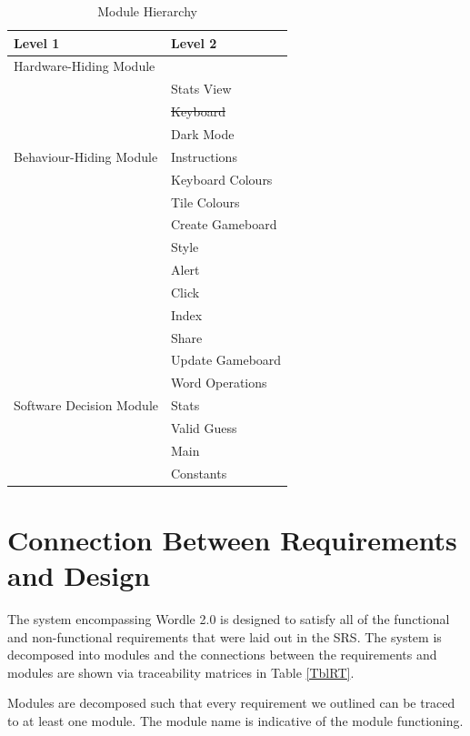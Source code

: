 \documentclass[12pt, titlepage]{article}
\begin{document}
	
	\begin{table}[h!]
		\centering
		\begin{tabular}{p{} p{}}
			\toprule
			\textbf{Level 1} & \textbf{Level 2}\\
			\midrule
			
			{Hardware-Hiding Module} & ~ \\
			\midrule
			
			\multirow{7}{0.3\textwidth}{Behaviour-Hiding Module} & Stats View \\
			& \st{Keyboard}\\
			& Dark Mode\\
			& Instructions\\
			& Keyboard Colours\\
			& Tile Colours\\
			& Create Gameboard\\ 
			& Style\\
			& Alert\\
			& Click\\
			& Index\\
			& Share\\
			& Update Gameboard\\
			\midrule
			
			\multirow{3}{0.3\textwidth}{Software Decision Module} & {Word Operations}\\
			& Stats\\
			& Valid Guess\\
			& Main\\
			& Constants\\
			\bottomrule
			
		\end{tabular}
		\caption{Module Hierarchy}
		\label{TblMH}
	\end{table}
	
	\section{Connection Between Requirements and Design} \label{SecConnection}
	The system encompassing Wordle 2.0 is designed to satisfy all of the functional and non-functional requirements that were laid out in the SRS. The system is decomposed into modules and the connections between the requirements and modules are shown via traceability matrices in Table \ref{TblRT}.
	
	Modules are decomposed such that every requirement we outlined can be traced to at least one module. The module name is indicative of the module functioning.
	
\end{document}
